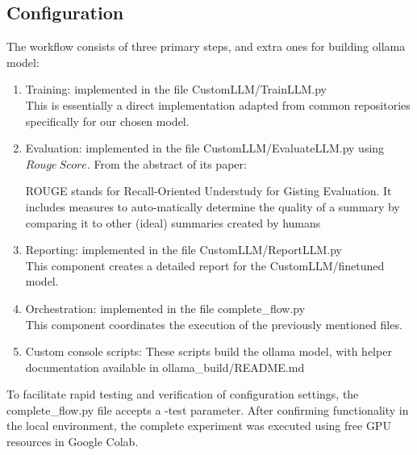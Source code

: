 \documentclass{cpsc202}
\begin{document}
    \subsection{Configuration}
    The workflow consists of three primary steps, and extra ones for building ollama model:
    \begin{enumerate}
        \item Training: implemented in the file CustomLLM/TrainLLM.py \\
        This is essentially a direct implementation adapted from common repositories specifically for our chosen model.
        \item Evaluation: implemented in the file CustomLLM/EvaluateLLM.py using $Rouge~Score$. From the abstract of its paper:
        \begin{displayquote}
            ROUGE stands for Recall-Oriented Understudy for Gisting Evaluation. It includes measures to auto-matically determine the quality of a summary by comparing it to other (ideal) summaries created by humans
        \end{displayquote}

        \item Reporting: implemented in the file CustomLLM/ReportLLM.py \\
        This component creates a detailed report for the CustomLLM/finetuned model.
        \item Orchestration: implemented in the file complete\_flow.py \\
        This component coordinates the execution of the previously mentioned files.
        \item Custom console scripts: These scripts build the ollama model, with helper documentation available in ollama\_build/README.md
    \end{enumerate}

    To facilitate rapid testing and verification of configuration settings, the complete\_flow.py file accepts a -test parameter.
    After confirming functionality in the local environment, the complete experiment was executed using free GPU resources in Google Colab.
\end{document}

